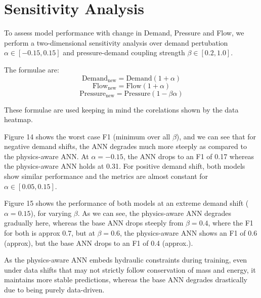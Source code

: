 \documentclass[final,5p,times,twocolumn,authoryear]{elsarticle}
\begin{document}
\section{Sensitivity Analysis}

To assess model performance with change in Demand, Pressure and Flow, we perform a two-dimensional sensitivity analysis over demand pertubation $\alpha \in [-0.15, 0.15]$ and pressure-demand coupling strength $\beta \in [0.2, 1.0]$.

The formulae are:
\[
\text{Demand}_{\text{new}} = \text{Demand}(1 + \alpha)
\]
\[
\text{Flow}_{\text{new}} = \text{Flow}(1 + \alpha)
\]
\[
\text{Pressure}_{\text{new}} = \text{Pressure}(1 - \beta\alpha)
\]

These formulae are used keeping in mind the corelations shown by the data heatmap.

Figure 14 shows the worst case F1 (minimum over all $\beta$), and we can see that for negative demand shifts, the ANN degrades much more steeply as compared to the physics-aware ANN. At $\alpha = -0.15$, the ANN drops to an F1 of 0.17 whereas the physics-aware ANN holds at 0.31. For positive demand shift, both models show similar performance and the metrics are almost constant for $\alpha \in [0.05, 0.15]$.

Figure 15 shows the performance of both models at an extreme demand shift ($\alpha = 0.15$), for varying $\beta$. As we can see, the physics-aware ANN degrades gradually here, whereas the base ANN drops steeply from $\beta = 0.4$, where the F1 for both is approx 0.7, but at $\beta = 0.6$, the physics-aware ANN shows an F1 of 0.6 (approx), but the base ANN drops to an F1 of 0.4 (approx.).

As the physics-aware ANN embeds hydraulic constraints during training, even under data shifts that may not strictly follow conservation of mass and energy, it maintains more stable predictions, whereas the base ANN degrades drastically due to being purely data-driven.
\end{document}
